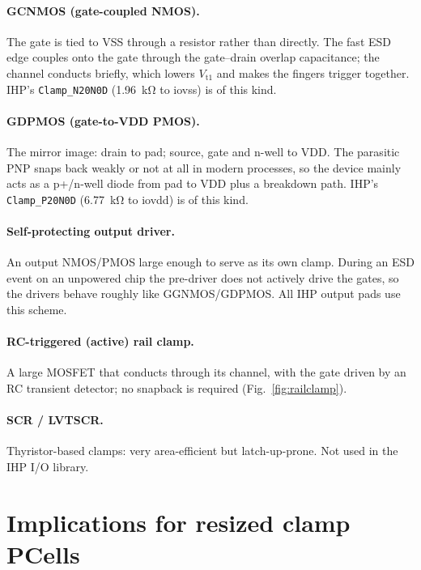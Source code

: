 \documentclass[11pt,a4paper]{article}
\newcommand{\cell}[1]{\texttt{#1}}
\begin{document}
\paragraph{GCNMOS (gate-coupled NMOS).}
The gate is tied to VSS through a resistor rather than directly. The fast ESD
edge couples onto the gate through the gate--drain overlap capacitance; the
channel conducts briefly, which lowers $V_\mathrm{t1}$ and makes the fingers
trigger together. IHP's \cell{Clamp\_N20N0D} (\SI{1.96}{\kilo\ohm} to iovss) is
of this kind.

\paragraph{GDPMOS (gate-to-VDD PMOS).}
The mirror image: drain to pad; source, gate and n-well to VDD. The parasitic
PNP snaps back weakly or not at all in modern processes, so the device mainly
acts as a p+/n-well diode from pad to VDD plus a breakdown path. IHP's
\cell{Clamp\_P20N0D} (\SI{6.77}{\kilo\ohm} to iovdd) is of this kind.

\paragraph{Self-protecting output driver.}
An output NMOS/PMOS large enough to serve as its own clamp. During an ESD event
on an unpowered chip the pre-driver does not actively drive the gates, so the
drivers behave roughly like GGNMOS/GDPMOS. All IHP output pads use this scheme.

\paragraph{RC-triggered (active) rail clamp.}
A large MOSFET that conducts through its channel, with the gate driven by an RC
transient detector; no snapback is required (Fig.~\ref{fig:railclamp}).

\paragraph{SCR / LVTSCR.}
Thyristor-based clamps: very area-efficient but latch-up-prone. Not used in the
IHP I/O library.

\section{Implications for resized clamp PCells}
\end{document}
